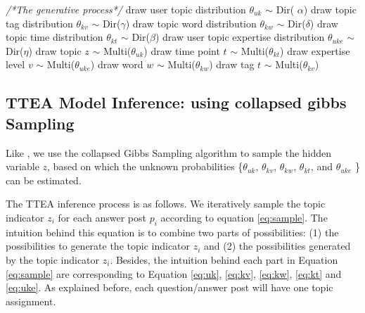 {{{{{{{\begin{algorithm}%
\begin{algorithmic}[1]
\label{algo:algotopic}
\State \textit{/*The generative process*/}
\State draw user topic distribution $\theta_{uk}$ $\sim$ Dir( $\alpha$) 
\EndFor
{} 
\State draw topic tag distribution $\theta_{kv}$ $\sim$ Dir($\gamma$)
\State draw topic word distribution $\theta_{kw}$ $\sim$ Dir($\delta$)
\State draw topic time distribution $\theta_{kt}$ $\sim$ Dir($\beta$)
\EndFor
{}
\State draw user topic expertise distribution $\theta_{uke}$ $\sim$ Dir($\eta$) 
\EndFor
\EndFor
{}
\State draw topic $z$ $\sim$ Multi($\theta_{uk}$)
\State draw time point $t$ $\sim$ Multi($\theta_{kt}$)
\State draw expertise level $v$ $\sim$ Multi($\theta_{uke}$) 
\State draw word $w$ $\sim$ Multi($\theta_{kw}$) 
\EndFor
{} 
\State draw tag $t$ $\sim$ Multi($\theta_{kv}$)
\EndFor
\EndFor
\end{algorithmic}
\end{algorithm}

\subsection{TTEA Model Inference: using collapsed gibbs Sampling}

Like \cite{hu2014user}, we use the collapsed Gibbs Sampling algorithm \cite{griffiths2004finding} to sample the hidden variable $z$, based on which the unknown probabilities \{$\theta_{uk}$, $\theta_{kv}$, $\theta_{kw}$, $\theta_{kt}$,  and $\theta_{uke}$ \}%
can be estimated. %



The TTEA inference process is as follows.
We iteratively sample the topic indicator $z_i$ for each answer post $p_i$ according to equation \ref{eq:sample}. The intuition behind this equation is to combine two parts of possibilities: (1) the possibilities to generate the topic indicator $z_i$ and (2) the possibilities generated by the topic indicator $z_i$. Besides, the intuition behind each part in Equation \ref{eq:sample} are corresponding to Equation \ref{eq:uk}, \ref{eq:kv}, \ref{eq:kw}, \ref{eq:kt} and \ref{eq:uke}. As explained before, each question/answer post will have one topic assignment. 


}}}}}}}
